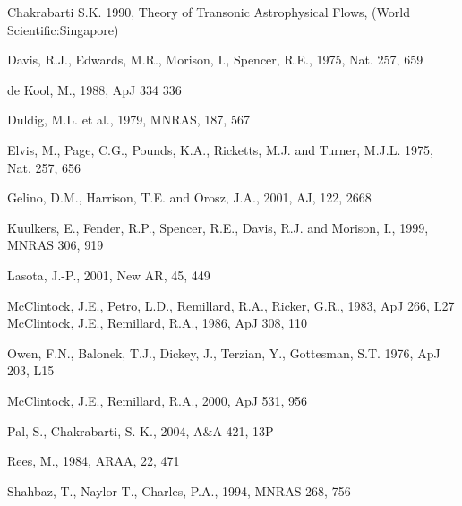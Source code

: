 \documentclass[referee]{cjaa}           %
\begin{document}
\begin{thebibliography}{99}

\bibitem[]{}
Chakrabarti S.K. 1990, Theory of Transonic Astrophysical Flows, (World Scientific:Singapore)
                                                                                
\bibitem[]{}
Davis, R.J., Edwards, M.R., Morison, I., Spencer, R.E., 1975, Nat. 257, 659
                                                                                
\bibitem[]{}
de Kool, M., 1988, ApJ 334 336
                                                                                
\bibitem[]{}
Duldig, M.L. et al., 1979, MNRAS, 187, 567
                                                                                
\bibitem[]{}
Elvis, M., Page, C.G., Pounds, K.A., Ricketts, M.J. and Turner, M.J.L. 1975, Nat. 257, 656
                                                                                
\bibitem[]{}
Gelino, D.M., Harrison, T.E. and Orosz, J.A., 2001, AJ, 122, 2668
                                                                                
\bibitem[]{}
Kuulkers, E., Fender, R.P., Spencer, R.E., Davis, R.J. and Morison, I., 1999, MNRAS 306, 919
                                                                                
\bibitem[]{}
Lasota, J.-P., 2001, New AR, 45, 449
                                                                                
\bibitem[]{}
McClintock, J.E., Petro, L.D., Remillard, R.A., Ricker, G.R., 1983, ApJ 266, L27                                                                                
\bibitem[]{}
McClintock, J.E., Remillard, R.A., 1986, ApJ 308, 110
                                                                                
\bibitem[]{}
Owen, F.N., Balonek, T.J., Dickey, J., Terzian, Y., Gottesman, S.T. 1976, ApJ 203, L15
                                                                                
\bibitem[]{}
McClintock, J.E., Remillard, R.A., 2000, ApJ 531, 956
                                                                                
\bibitem[]{}
Pal, S., Chakrabarti, S. K., 2004, A\&A 421, 13P 

\bibitem[]{}
Rees, M., 1984, ARAA, 22, 471
                                                                                
\bibitem[]{}
Shahbaz, T., Naylor T., Charles, P.A., 1994, MNRAS 268, 756
                                                                                
\end{thebibliography}

\label{lastpage}
\end{document}
